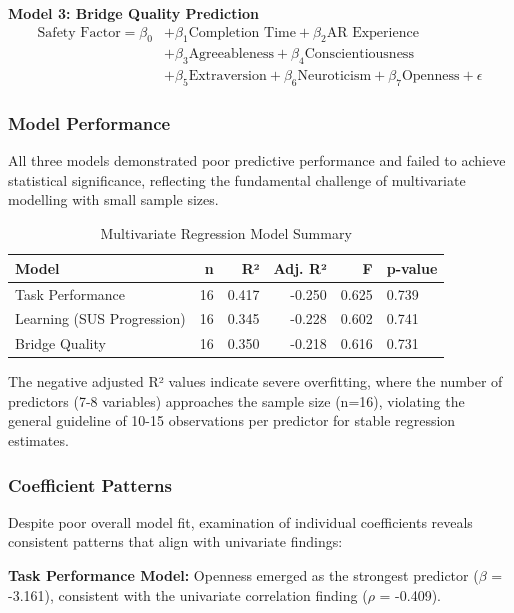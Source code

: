 \textbf{Model 3: Bridge Quality Prediction}
\begin{align}
\text{Safety Factor} = \beta_0 &+ \beta_1 \text{Completion Time} + \beta_2 \text{AR Experience} \nonumber \\
&+ \beta_3 \text{Agreeableness} + \beta_4 \text{Conscientiousness} \nonumber \\
&+ \beta_5 \text{Extraversion} + \beta_6 \text{Neuroticism} + \beta_7 \text{Openness} + \epsilon
\end{align}

\subsubsection{Model Performance}

All three models demonstrated poor predictive performance and failed to achieve statistical significance, reflecting the fundamental challenge of multivariate modelling with small sample sizes.

\begin{table}[h]
\centering
\caption{Multivariate Regression Model Summary}
\label{tab:multivariate_regression_summary}
\begin{tabular}{lrrrrl}
\toprule
\textbf{Model} & \textbf{n} & \textbf{R²} & \textbf{Adj. R²} & \textbf{F} & \textbf{p-value} \\
\midrule
Task Performance & 16 & 0.417 & -0.250 & 0.625 & 0.739 \\
Learning (SUS Progression) & 16 & 0.345 & -0.228 & 0.602 & 0.741 \\
Bridge Quality & 16 & 0.350 & -0.218 & 0.616 & 0.731 \\
\bottomrule
\end{tabular}
\end{table}

The negative adjusted R² values indicate severe overfitting, where the number of predictors (7-8 variables) approaches the sample size (n=16), violating the general guideline of 10-15 observations per predictor for stable regression estimates.

\subsubsection{Coefficient Patterns}

Despite poor overall model fit, examination of individual coefficients reveals consistent patterns that align with univariate findings:

\textbf{Task Performance Model:} Openness emerged as the strongest predictor ($\beta$ = -3.161), consistent with the univariate correlation finding ($\rho$ = -0.409).

